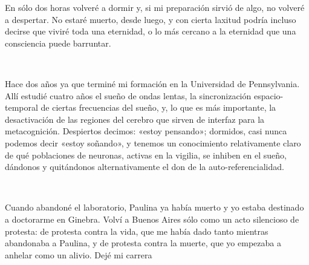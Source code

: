\documentclass[a4paper, 12pt]{article}
\begin{document}
En sólo dos horas volveré a dormir y, si mi preparación sirvió de algo, no
volveré a despertar. No estaré muerto, desde luego, y con cierta laxitud podría
incluso decirse que viviré toda una eternidad, o lo más cercano a la eternidad
que una consciencia puede barruntar.

~

Hace dos años ya que terminé mi formación en la Universidad de Pennsylvania.
Allí estudié cuatro años el sueño de ondas lentas, la sincronización
espacio-temporal de ciertas frecuencias del sueño, y, lo que es más importante,
la desactivación de las regiones del cerebro que sirven de interfaz para la
metacognición. Despiertos decimos: «estoy pensando»; dormidos, casi nunca
podemos decir «estoy soñando», y tenemos un conocimiento relativamente claro de
qué poblaciones de neuronas, activas en la vigilia, se inhiben en el sueño,
dándonos y quitándonos alternativamente el don de la auto-referencialidad. 

~ 

Cuando abandoné el laboratorio, Paulina ya había muerto y yo estaba destinado a
doctorarme en Ginebra. Volví a Buenos Aires sólo como un acto silencioso de
protesta: de protesta contra la vida, que me había dado tanto mientras
abandonaba a Paulina, y de protesta contra la muerte, que yo empezaba a anhelar
como un alivio. Dejé mi carrera
\end{document}
